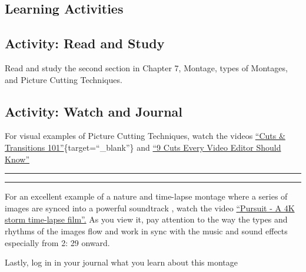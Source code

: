 \documentclass[
]{book}
\begin{document}
\hypertarget{learning-activities-1}{%
\subsection*{Learning Activities}\label{learning-activities-1}}

\hypertarget{activity-read-and-study-2}{%
\subsection*{Activity: Read and Study}\label{activity-read-and-study-2}}

\begin{reflect}
Read and study the second section in Chapter 7, Montage, types of Montages, and Picture Cutting Techniques.
\end{reflect}

\hypertarget{activity-watch-and-journal}{%
\subsection*{Activity: Watch and Journal}\label{activity-watch-and-journal}}

\begin{reflect}
For visual examples of Picture Cutting Techniques, watch the videos \href{https://www.youtube.com/watch?v=OAH0MoAv2CI}{``Cuts \& Transitions 101''}\{target=``\_blank''\} and \href{https://www.youtube.com/watch?v=Wv3Hmf2Dxlo}{``9 Cuts Every Video Editor Should Know''}

\begin{center}\rule{0.5\linewidth}{0.5pt}\end{center}

\begin{center}\rule{0.5\linewidth}{0.5pt}\end{center}

For an excellent example of a nature and time-lapse montage where a series of images are synced into a powerful soundtrack , watch the video \href{https://www.youtube.com/watch?v=oagszCmJLpU}{``Pursuit - A 4K storm time-lapse film''.} As you view it, pay attention to the way the types and rhythms of the images flow and work in sync with the music and sound effects especially from 2: 29 onward.

Lastly, log in in your journal what you learn about this montage
\end{reflect}
\end{document}
